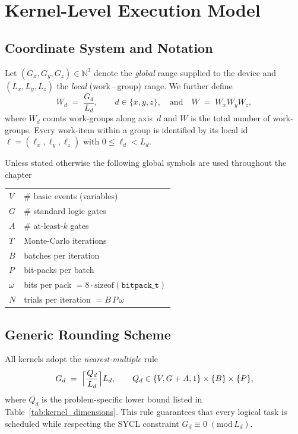 \section{Kernel-Level Execution Model}
\label{sec:kernel_execution_model}

\subsection{Coordinate System and Notation}

Let $(G_x,G_y,G_z)\in\mathbb{N}^3$ denote the \emph{global} range supplied to the device and $(L_x,L_y,L_z)$ the \emph{local} (work\,–\,group) range.  We further define
\[
  W_d \;=\; \frac{G_d}{L_d},\qquad d\in\{x,y,z\},
  \quad\text{and}\quad
  W \;=\; W_x W_y W_z ,
\]
where $W_d$ counts work-groups along axis~$d$ and $W$ is the total number of work-groups.  Every work-item within a group is identified by its local id $\ell=(\ell_x,\ell_y,\ell_z)$ with $0\le \ell_d<L_d$.

Unless stated otherwise the following global symbols are used throughout the chapter
\begin{center}
\begin{tabular}{ll}
$V$  & \# basic events (variables)\\
$G$  & \# standard logic gates\\
$A$  & \# at-least-$k$ gates\\
$T$  & Monte-Carlo iterations\\
$B$  & batches per iteration\\
$P$  & bit-packs per batch\\
$\omega$ & bits per pack $=8\cdot\mathrm{sizeof}(\texttt{bitpack\_t})$\\
$N$  & trials per iteration $=B\,P\,\omega$
\end{tabular}
\end{center}

\subsection{Generic Rounding Scheme}

All kernels adopt the \emph{nearest-multiple} rule
\[
   G_d \;=\;
   \Bigl\lceil \frac{Q_d}{L_d} \Bigr\rceil L_d ,\qquad
   Q_d \in \{V,G+A,1\}\times\{B\}\times\{P\},
\]
where $Q_d$ is the problem-specific lower bound listed in Table~\ref{tab:kernel_dimensions}.  This rule guarantees that every logical task is scheduled while respecting the SYCL constraint $G_d\equiv 0 \; (\mathrm{mod}\,L_d)$.


